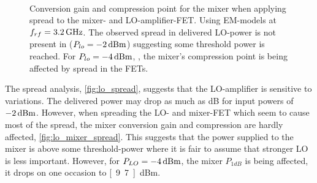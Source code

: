			\begin{figure}[hpt!]
				\centering
				 \\
				\caption{Conversion gain and compression point for the mixer when applying spread to the mixer- and LO-amplifier-FET. Using EM-models at $f_{rf}=\unit[3.2]{GHz}$. The observed spread in delivered LO-power is not present in  ($P_{lo}=\unit[-2]{dBm}$) suggesting some threshold power is reached. For $P_{lo}=\unit[-4]{dBm}$, , the mixer's compression point is being affected by spread in the FETs.}\label{fig:lo_mixer_spread}
			\end{figure}







			The spread analysis, \autoref{fig:lo_spread}, suggests that the LO-amplifier is sensitive to variations. The delivered power may drop as much as \unit[2]{dB} for input powers of $\unit[-2]{dBm}$. %
However, when spreading the LO- and mixer-FET which seem to cause most of the spread, the mixer conversion gain and compression are hardly affected, \autoref{fig:lo_mixer_spread}. This suggests that the power supplied to the mixer is above some threshold-power where it is fair to assume that stronger LO is less important\autocite{yhland1999}. However, for $P_{LO}=\unit[-4]{dBm}$, the mixer $P_{1dB}$ is being affected, it drops on one occasion to \unit[9.7]{dBm}.


